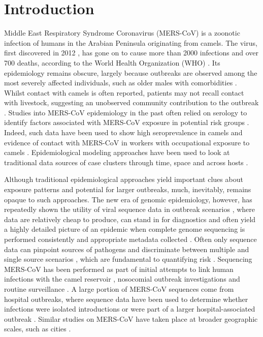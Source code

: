 \documentclass[11pt,oneside,letterpaper]{article}
\begin{document}
\section*{Introduction}
Middle East Respiratory Syndrome Coronavirus (MERS-CoV) is a zoonotic infection of humans in the Arabian Peninsula originating from camels.
The virus, first discovered in 2012 \citep{zaki_isolation_2012,boheemen_genomic_2012}, has gone on to cause more than 2000  infections and over 700 deaths, according to the World Health Organization (WHO) \citep{mersfactsheet}.
Its epidemiology remains obscure, largely because outbreaks are observed among the most severely affected individuals, such as older males with comorbidities \citep{assiri_2013,group_state_2013}.
Whilst contact with camels is often reported, patients may not recall contact with livestock, suggesting an unobserved community contribution to the outbreak \citep{group_state_2013}.
Studies into MERS-CoV epidemiology in the past often relied on serology to identify factors associated with MERS-CoV exposure in potential risk groups \citep{reusken_occupational_2015,reusken_2013}.
Indeed, such data have been used to show high seroprevalence in camels \citep{muller_2014,corman_antibodies_2014,chu_2014,reusken_2013,reusken_2014} and evidence of contact with MERS-CoV in workers with occupational exposure to camels \citep{reusken_occupational_2015,muller_presence_2015}.
Epidemiological modeling approaches have been used to look at traditional data sources of case clusters through time, space and across hosts \citep{cauchemez_unraveling_2016}.


Although traditional epidemiological approaches yield important clues about exposure patterns and potential for larger outbreaks, much, inevitably, remains opaque to such approaches.
The new era of genomic epidemiology, however, has repeatedly shown the utility of viral sequence data in outbreak scenarios \citep{quick_real-time_2016,arias_rapid_2016}, where data are relatively cheap to produce, can stand in for diagnostics and often yield a highly detailed picture of an epidemic when complete genome sequencing is performed consistently and appropriate metadata collected \citep{dudas_virus_2017}.
Often only sequence data can pinpoint sources of pathogens and discriminate between multiple and single source scenarios \citep{gire_genomic_2014}, which are fundamental to quantifying risk \citep{grubaugh_multiple_2017}.
Sequencing MERS-CoV has been performed as part of initial attempts to link human infections with the camel reservoir \citep{memish_human_2014}, nosocomial outbreak investigations \citep{assiri_hospital_2013} and routine surveillance \citep{park_acute_2015}.
A large portion of MERS-CoV sequences come from hospital outbreaks, where sequence data have been used to determine whether infections were isolated introductions or were part of a larger hospital-associated outbreak \citep{fagbo_molecular_2015}.
Similar studies on MERS-CoV have taken place at broader geographic scales, such as cities \citep{cotten_2013}.
\end{document}
